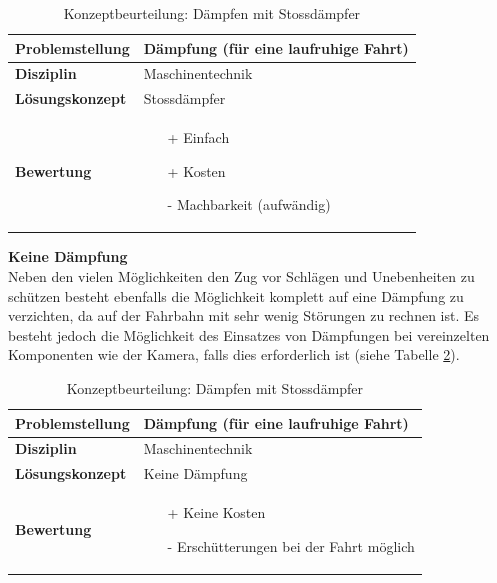 \documentclass[../../main.tex]{subfiles}
\begin{document}

  \begin{flushleft}
    \begin{table}[h]
    \begin{tabular}{ | l | p{11cm} |}
    \hline
    \textbf{Problemstellung} & Dämpfung (für eine laufruhige Fahrt) \\ \hline
    \textbf{Disziplin} & Maschinentechnik \\ \hline
    \textbf{Lösungskonzept} & Stossdämpfer \\ \hline
    \textbf{Bewertung} &  \begin{itemize}
                            \item[+] Einfach
                            \item[+] Kosten
                            \item[-] Machbarkeit (aufwändig)
                          \end{itemize} \\ \hline
    \end{tabular}
    \caption{Konzeptbeurteilung: Dämpfen mit Stossdämpfer}
    \label{tab:stossdaempfer}
\end{table}
\end{flushleft}

\textbf{Keine Dämpfung}\\
Neben den vielen Möglichkeiten den Zug vor Schlägen und Unebenheiten zu schützen besteht ebenfalls die Möglichkeit komplett auf eine Dämpfung zu verzichten, da auf der Fahrbahn mit sehr wenig Störungen zu rechnen ist. Es besteht jedoch die Möglichkeit des Einsatzes von Dämpfungen bei vereinzelten Komponenten wie der Kamera, falls dies erforderlich ist (siehe Tabelle \ref{tab:keinedaempfung}).

\begin{flushleft}
    \begin{table}[h]
    \begin{tabular}{ | l | p{11cm} |}
    \hline
    \textbf{Problemstellung} & Dämpfung (für eine laufruhige Fahrt) \\ \hline
    \textbf{Disziplin} & Maschinentechnik \\ \hline
    \textbf{Lösungskonzept} & Keine Dämpfung \\ \hline
    \textbf{Bewertung} &  \begin{itemize}
                            \item[+] Keine Kosten
                            \item[-] Erschütterungen bei der Fahrt möglich
                          \end{itemize} \\ \hline
    \end{tabular}
    \caption{Konzeptbeurteilung: Dämpfen mit Stossdämpfer}
    \label{tab:keinedaempfung}
\end{table}
\end{flushleft}
\end{document}
